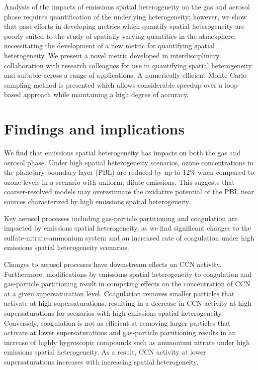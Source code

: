 Analysis of the impacts of emissions spatial heterogeneity on the gas and aerosol phase requires quantification of the underlying heterogeneity; however, we show that past efforts in developing metrics which quantify spatial heterogeneity are poorly suited to the study of spatially varying quantities in the atmosphere, necessitating the development of a new metric for quantifying spatial heterogeneity. We present a novel metric developed in interdisciplinary collaboration with research colleagues for use in quantifying spatial heterogeneity and suitable across a range of applications. A numerically efficient Monte Carlo sampling method is presented which allows considerable speedup over a loop-based approach while maintaining a high degree of accuracy. 

\section{Findings and implications}

We find that emissions spatial heterogeneity has impacts on both the gas and aerosol phase. Under high spatial heterogeneity scenarios, ozone concentrations in the planetary boundary layer (PBL) are reduced by up to 12\% when compared to ozone levels in a scenario with uniform, dilute emissions. This suggests that coarser-resolved models may overestimate the oxidative potential of the PBL near sources characterized by high emissions spatial heterogeneity. 

Key aerosol processes including gas-particle partitioning and coagulation are impacted by emissions spatial heterogeneity, as we find significant changes to the sulfate-nitrate-ammonium system and an increased rate of coagulation under high emissions spatial heterogeneity scenarios. 

Changes to aerosol processes have downstream effects on CCN activity. Furthermore, modifications by emissions spatial heterogeneity to coagulation and gas-particle partitioning result in competing effects on the concentration of CCN at a given supersaturation level. Coagulation removes smaller particles that activate at high supersaturations, resulting in a decrease in CCN activity at high supersaturations for scenarios with high emissions spatial heterogeneity. Conversely, coagulation is not as efficient at removing larger particles that activate at lower supersaturations and gas-particle partitioning results in an increase of highly hygroscopic compounds such as ammonium nitrate under high emissions spatial heterogeneity. As a result, CCN activity at lower supersaturations increases with increasing spatial heterogeneity.  

